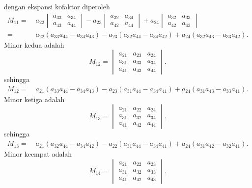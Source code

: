 dengan ekspansi kofaktor diperoleh
\begin{align}
	M_{11}
	=&\;
	a_{22}
	\begin{vmatrix}
		a_{33}&a_{34}\\
		a_{43}&a_{44}
	\end{vmatrix}
	-
	a_{23}
	\begin{vmatrix}
		a_{32}&a_{34}\\
		a_{42}&a_{44}
	\end{vmatrix}
	+
	a_{24}
	\begin{vmatrix}
		a_{32}&a_{33}\\
		a_{42}&a_{43}
	\end{vmatrix}
	\nonumber\\
	=&\;
	a_{22}(a_{33}a_{44}-a_{34}a_{43})
	-a_{23}(a_{32}a_{44}-a_{34}a_{42})
	+a_{24}(a_{32}a_{43}-a_{33}a_{42}).
\end{align}
Minor kedua adalah
\begin{equation}
	M_{12}
	=
	\begin{vmatrix}
		a_{21}&a_{23}&a_{24}\\
		a_{31}&a_{33}&a_{34}\\
		a_{41}&a_{43}&a_{44}
	\end{vmatrix}.
\end{equation}
sehingga
\begin{align}
	M_{12}
	=&\;
	a_{21}(a_{33}a_{44}-a_{34}a_{43})
	-a_{23}(a_{31}a_{44}-a_{34}a_{41})
	+a_{24}(a_{31}a_{43}-a_{33}a_{41}).
\end{align}
Minor ketiga adalah
\begin{equation}
	M_{13}
	=
	\begin{vmatrix}
		a_{21}&a_{22}&a_{24}\\
		a_{31}&a_{32}&a_{34}\\
		a_{41}&a_{42}&a_{44}
	\end{vmatrix}.
\end{equation}
sehingga
\begin{align}
	M_{13}
	=&\;
	a_{21}(a_{32}a_{44}-a_{34}a_{42})
	-a_{22}(a_{31}a_{44}-a_{34}a_{41})
	+a_{24}(a_{31}a_{42}-a_{32}a_{41}).
\end{align}
Minor keempat adalah
\begin{equation}
	M_{14}
	=
	\begin{vmatrix}
		a_{21}&a_{22}&a_{23}\\
		a_{31}&a_{32}&a_{33}\\
		a_{41}&a_{42}&a_{43}
	\end{vmatrix}.
\end{equation}
